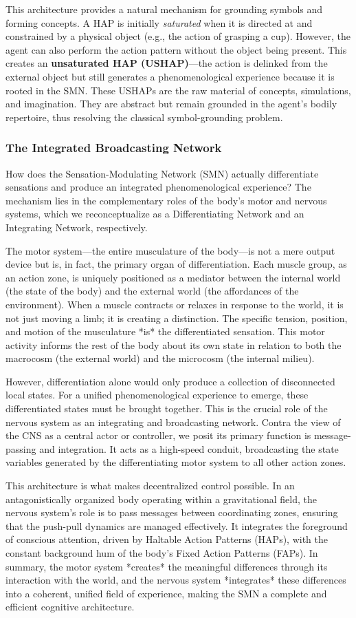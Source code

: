 This architecture provides a natural mechanism for grounding symbols and forming concepts. A HAP is initially \textit{saturated} when it is directed at and constrained by a physical object (e.g., the action of grasping a cup). However, the agent can also perform the action pattern without the object being present. This creates an \textbf{unsaturated HAP (USHAP)}—the action is delinked from the external object but still generates a phenomenological experience because it is rooted in the SMN. These USHAPs are the raw material of concepts, simulations, and imagination. They are abstract but remain grounded in the agent's bodily repertoire, thus resolving the classical symbol-grounding problem.

\subsubsection*{The Integrated Broadcasting Network}
How does the Sensation-Modulating Network (SMN) actually differentiate sensations and produce an integrated phenomenological experience? The mechanism lies in the complementary roles of the body's motor and nervous systems, which we reconceptualize as a Differentiating Network and an Integrating Network, respectively.

The motor system—the entire musculature of the body—is not a mere output device but is, in fact, the primary organ of differentiation. Each muscle group, as an action zone, is uniquely positioned as a mediator between the internal world (the state of the body) and the external world (the affordances of the environment). When a muscle contracts or relaxes in response to the world, it is not just moving a limb; it is creating a distinction. The specific tension, position, and motion of the musculature *is* the differentiated sensation. This motor activity informs the rest of the body about its own state in relation to both the macrocosm (the external world) and the microcosm (the internal milieu).

However, differentiation alone would only produce a collection of disconnected local states. For a unified phenomenological experience to emerge, these differentiated states must be brought together. This is the crucial role of the nervous system as an integrating and broadcasting network. Contra the view of the CNS as a central actor or controller, we posit its primary function is message-passing and integration. It acts as a high-speed conduit, broadcasting the state variables generated by the differentiating motor system to all other action zones.

This architecture is what makes decentralized control possible. In an antagonistically organized body operating within a gravitational field, the nervous system's role is to pass messages between coordinating zones, ensuring that the push-pull dynamics are managed effectively. It integrates the foreground of conscious attention, driven by Haltable Action Patterns (HAPs), with the constant background hum of the body's Fixed Action Patterns (FAPs). In summary, the motor system *creates* the meaningful differences through its interaction with the world, and the nervous system *integrates* these differences into a coherent, unified field of experience, making the SMN a complete and efficient cognitive architecture.
